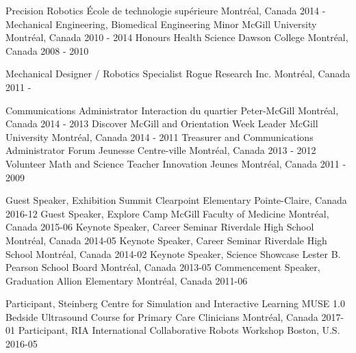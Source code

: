 \documentclass[11pt, letterpaper]{awesome-cv}
\begin{document}
\makecvheader

\begin{cventries}
  \cventry
  {Precision Robotics}
  {École de technologie supérieure}
  {Montréal, Canada}
  {2014 - }
  {}
  \cventry
  {Mechanical Engineering, Biomedical Engineering Minor}
  {McGill University}
  {Montréal, Canada}
  {2010 - 2014}
  {}
  \cventry
  {Honours Health Science}
  {Dawson College}
  {Montréal, Canada}
  {2008 - 2010}
  {}
  \end{cventries}

\begin{cventries}
  \cventry
  {Mechanical Designer / Robotics Specialist}
  {Rogue Research Inc.}
  {Montréal, Canada}
  {2011 - }
  {}
  \end{cventries}

\begin{cventries}
  \cventry
  {Communications Administrator}
  {Interaction du quartier Peter-McGill}
  {Montréal, Canada}
  {2014 - 2013}
  {}
  \cventry
  {Discover McGill and Orientation Week Leader}
  {McGill University}
  {Montréal, Canada}
  {2014 - 2011}
  {}
  \cventry
  {Treasurer and Communications Administrator}
  {Forum Jeunesse Centre-ville}
  {Montréal, Canada}
  {2013 - 2012}
  {}
  \cventry
  {Volunteer Math and Science Teacher}
  {Innovation Jeunes}
  {Montréal, Canada}
  {2011 - 2009}
  {}
  \end{cventries}

\begin{cventries}
  \cventry
  {Guest Speaker, Exhibition Summit}
  {Clearpoint Elementary}
  {Pointe-Claire, Canada}
  {2016-12}
  {}
  \cventry
  {Guest Speaker, Explore Camp}
  {McGill Faculty of Medicine}
  {Montréal, Canada}
  {2015-06}
  {}
  \cventry
  {Keynote Speaker, Career Seminar}
  {Riverdale High School}
  {Montréal, Canada}
  {2014-05}
  {}
  \cventry
  {Keynote Speaker, Career Seminar}
  {Riverdale High School}
  {Montréal, Canada}
  {2014-02}
  {}
  \cventry
  {Keynote Speaker, Science Showcase}
  {Lester B. Pearson School Board}
  {Montréal, Canada}
  {2013-05}
  {}
  \cventry
  {Commencement Speaker, Graduation}
  {Allion Elementary}
  {Montréal, Canada}
  {2011-06}
  {}
  \end{cventries}

\begin{cventries}
  \cventry
  {Participant, Steinberg Centre for Simulation and Interactive Learning}
  {MUSE 1.0 Bedside Ultrasound Course for Primary Care Clinicians}
  {Montréal, Canada}
  {2017-01}
  {}
  \cventry
  {Participant, RIA International}
  {Collaborative Robots Workshop}
  {Boston, U.S.}
  {2016-05}
  {}
  \end{cventries}
\end{document}
